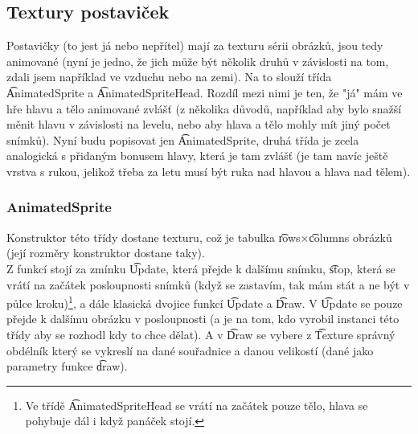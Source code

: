 \subsection{Textury postaviček}
Postavičky (to jest já nebo nepřítel) mají za texturu sérii obrázků, jsou tedy animované (nyní je jedno, že jich může být několik druhů v závislosti na tom, zdali jsem například ve vzduchu nebo na zemi). Na to slouží třída \t{AnimatedSprite} a \t{AnimatedSpriteHead}. Rozdíl mezi nimi je ten, že "já" mám ve hře hlavu a tělo animované zvlášť (z několika důvodů, například aby bylo snažší měnit hlavu v závislosti na levelu, nebo aby hlava a tělo mohly mít jiný počet snímků). Nyní budu popisovat jen \t{AnimatedSprite}, druhá třída je zcela analogická s přidaným bonusem hlavy, která je tam zvlášť (je tam navíc ještě vrstva s rukou, jelikož třeba za letu musí být ruka nad hlavou a hlava nad tělem).
\subsubsection{AnimatedSprite}
Konstruktor této třídy dostane texturu, což je tabulka \t{rows}$\times$\t{columns} obrázků (její rozměry konstruktor dostane taky). \\
Z funkcí stojí za zmínku \t{Update}, která přejde k dalšímu snímku, \t{stop}, která se vrátí na začátek posloupnosti snímků (když se zastavím, tak mám stát a ne být v půlce kroku)\footnote{Ve třídě \t{AnimatedSpriteHead} se vrátí na začátek pouze tělo, hlava se pohybuje dál i když panáček stojí.}, a dále klasická dvojice funkcí \t{Update} a \t{Draw}. V \t{Update} se pouze přejde k dalšímu obrázku v posloupnosti (a je na tom, kdo vyrobil instanci této třídy aby se rozhodl kdy to chce dělat). A v \t{Draw} se vybere z \t{Texture} správný obdélník který se vykreslí na dané souřadnice a danou velikostí (dané jako parametry funkce \t{draw}).
